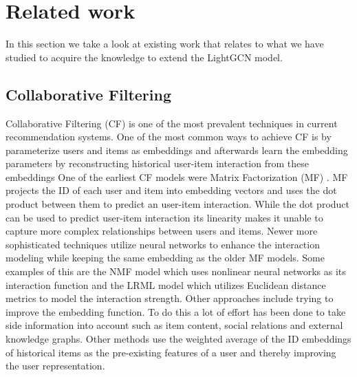 \section{Related work}
In this section we take a look at existing work that relates to what we have studied to acquire the knowledge to extend the LightGCN model.

\subsection{Collaborative Filtering}
Collaborative Filtering (CF) is one of the most prevalent techniques in current recommendation systems\cite{YT_rec,NGCF_2019,Pint_rec,COL_MEM_NET}.
One of the most common ways to achieve CF is by parameterize users and items as embeddings and afterwards learn the embedding parameters by reconstructing historical user-item interaction from these embeddings\cite{NGCF_2019}
One of the earliest CF models were Matrix Factorization (MF) \cite{Matrix-factorization-techniques, BAY_PER_RAN}.
MF  projects the ID of each user and item into embedding vectors and uses the dot product between them to predict an user-item interaction.
While the dot product can be used to predict user-item interaction its linearity makes it unable to capture more complex relationships between users and items.
Newer more sophisticated techniques utilize neural networks to enhance the interaction modeling while keeping the same embedding as the older MF models.
Some examples of this are the NMF model\cite{NEU_COL_FIL} which uses nonlinear neural networks as its interaction function and the LRML model\cite{LAT_REL_MET} which utilizes Euclidean distance metrics to model the interaction strength.
Other approaches include trying to improve the embedding function.
To do this a lot of effort has been done to take side information into account such as item content\cite{ATT_COL_FIL_MUL}, social relations\cite{REC_SOC_USE} and external knowledge graphs\cite{KGAT, KNO_GRA_REC}.
Other methods use the weighted average of the ID embeddings of historical items as the pre-existing features of a user and thereby improving the user representation\cite{SVD_PLUSPLUS,FISM}.
 

